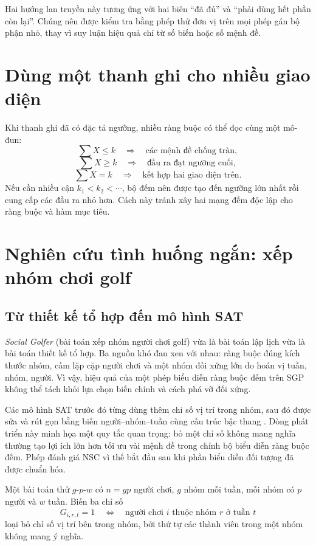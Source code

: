 Hai hướng lan truyền này tương ứng với hai biên ``đã đủ'' và ``phải dùng hết
phần còn lại''. Chúng nên được kiểm tra bằng phép thử đơn vị trên mọi phép gán
bộ phận nhỏ, thay vì suy luận hiệu quả chỉ từ số biến hoặc số mệnh đề.

\section{Dùng một thanh ghi cho nhiều giao diện}

Khi thanh ghi đã có đặc tả ngưỡng, nhiều ràng buộc có thể đọc cùng một mô-đun:
\[
  \sum X\le k
  \quad\Longrightarrow\quad
  \text{các mệnh đề chống tràn},
\]
\[
  \sum X\ge k
  \quad\Longrightarrow\quad
  \text{đầu ra đạt ngưỡng cuối},
\]
\[
  \sum X=k
  \quad\Longrightarrow\quad
  \text{kết hợp hai giao diện trên}.
\]
Nếu cần nhiều cận \(k_1<k_2<\cdots\), bộ đếm nên được tạo đến ngưỡng lớn nhất
rồi cung cấp các đầu ra nhỏ hơn. Cách này tránh xây hai mạng đếm độc lập cho
ràng buộc và hàm mục tiêu.

\section{Nghiên cứu tình huống ngắn: xếp nhóm chơi golf}

\subsection{Từ thiết kế tổ hợp đến mô hình SAT}

\emph{Social Golfer} (bài toán xếp nhóm người chơi golf) vừa là bài toán lập
lịch vừa là bài toán thiết kế tổ hợp. Ba
nguồn khó đan xen với nhau: ràng buộc đúng kích thước nhóm, cấm lặp cặp người
chơi và một nhóm đối xứng lớn do hoán vị tuần, nhóm, người. Vì vậy, hiệu quả
của một phép biểu diễn ràng buộc đếm trên SGP không thể tách khỏi lựa chọn biến
chính và cách phá vỡ đối xứng.

Các mô hình SAT trước đó từng dùng thêm chỉ số vị trí trong nhóm, sau đó được
sửa và rút gọn bằng biến người--nhóm--tuần cùng cấu trúc bậc thang
\parencite{triska2012golfer}. Dòng phát triển này minh họa một quy tắc quan
trọng: bỏ một chỉ số không mang nghĩa thường tạo lợi ích lớn hơn tối ưu vài
mệnh đề trong chính bộ biểu diễn ràng buộc đếm. Phép đánh giá NSC vì thế bắt đầu sau
khi phần biểu diễn đối tượng đã được chuẩn hóa.

Một bài toán thử \(g\)-\(p\)-\(w\) có \(n=gp\) người chơi, \(g\) nhóm mỗi tuần,
mỗi nhóm có \(p\) người và \(w\) tuần. Biến ba chỉ số
\[
  G_{i,r,t}=1
  \quad\Longleftrightarrow\quad
  \text{người chơi \(i\) thuộc nhóm \(r\) ở tuần \(t\)}
\]
loại bỏ chỉ số vị trí bên trong nhóm, bởi thứ tự các thành viên trong một nhóm
không mang ý nghĩa.


